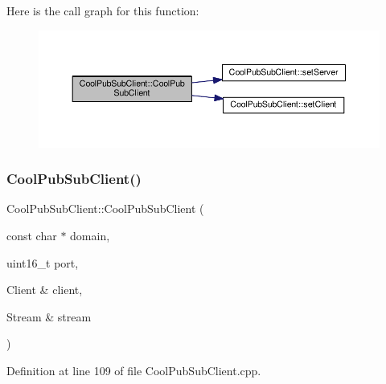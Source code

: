 Here is the call graph for this function\+:\nopagebreak
\begin{figure}[H]
\begin{center}
\leavevmode
\includegraphics[width=350pt]{class_cool_pub_sub_client_a469eefe7429f0cbb6d7d443b52488411_cgraph}
\end{center}
\end{figure}
\mbox{\label{class_cool_pub_sub_client_a103e7286407babde84d63bb735c4e4b6}} 
\subsubsection{\texorpdfstring{Cool\+Pub\+Sub\+Client()}{CoolPubSubClient()}\hspace{0.1cm}{\footnotesize\ttfamily [12/14]}}
{\footnotesize\ttfamily Cool\+Pub\+Sub\+Client\+::\+Cool\+Pub\+Sub\+Client (\begin{DoxyParamCaption}\item[{const char $\ast$}]{domain,  }\item[{uint16\+\_\+t}]{port,  }\item[{Client \&}]{client,  }\item[{Stream \&}]{stream }\end{DoxyParamCaption})}



Definition at line 109 of file Cool\+Pub\+Sub\+Client.\+cpp.

